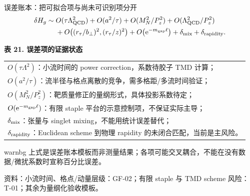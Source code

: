 \documentclass[UTF8,aspectratio=169,11pt]{ctexbeamer}
\newcommand{\source}[1]{%
  \par\vspace{-0.08em}%
  \noindent\parbox[t]{0.97\linewidth}{\raggedright\scriptsize\color{muted}资料：#1}\par}
\newcommand{\e}{\mathrm{e}}
\begin{document}
\begin{frame}[t]{误差账本：把可拟合项与尚未可识别项分开}
  \begin{align*}
    \delta H_g\sim{}&O(\tau\Lambda_{\rm QCD}^2)
      +O(a^2/\tau)+O(M_N^2/P_z^2)
      +O(\Lambda_{\rm QCD}^2/P_z^2)\\
      &+O\!\left((r_\tau/b_\perp)^2,(r_\tau/z)^2\right)
      +O\!\left(\e^{-m_{\rm gap}\ell}\right)
      +\delta_{\rm mix}+\delta_{\rm rapidity}.
  \end{align*}
  \begin{center}
  \textbf{表 21. 误差项的证据状态}
  \vspace{0.12em}
  {\scriptsize\begin{tabular}{@{}p{\linewidth}@{}}
    \toprule
    $O(\tau\Lambda^2)$：小流时间的 power correction，系数待胶子 TMD 计算；\\
    $O(a^2/\tau)$：流半径与格点离散的竞争，需多格距/多流时间验证；\\
    $O(M_N^2/P_z^2)$：靶质量修正的量纲形式，具体投影系数待定；\\
    $O(\e^{-m_{\rm gap}\ell})$：有限 staple 平台的示意控制项，不保证实际主导；\\
    $\delta_{\rm mix}$：张量与 singlet mixing，不能用统计误差替代；\\
    $\delta_{\rm rapidity}$：Euclidean scheme 到物理 rapidity 的未闭合匹配，当前是主风险。\\
    \bottomrule
  \end{tabular}}
  \end{center}
  \begin{beamercolorbox}[wd=0.96\textwidth,sep=0.45em,rounded=true]{warnbg}
    上式是误差账本模板而非测量结果；各项可能交叉耦合，不能在没有数据/微扰系数时宣称百分比误差。
  \end{beamercolorbox}
  \source{小流时间、格点/动量层级：GF-02；有限 staple 与 TMD scheme 风险：T-01；其余为量纲化验收模板。}
\end{frame}
\end{document}
